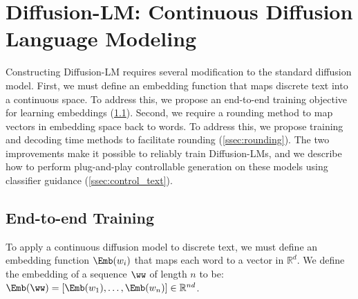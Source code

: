 













\section{Diffusion-LM: Continuous Diffusion Language Modeling}
\label{sec:method}

Constructing Diffusion-LM requires several modification to the standard diffusion model.
First, we must define an embedding function that maps discrete text into a continuous space. To address this, we propose an end-to-end training objective for learning embeddings (\cref{ssec:embeddings}). 
Second, we require a rounding method to map vectors in embedding space back to words. To address this, we propose training and decoding time methods to facilitate rounding (\cref{ssec:rounding}). 
The two improvements make it possible to reliably train Diffusion-LMs, and we describe how to perform plug-and-play controllable generation on these models using classifier guidance (\cref{ssec:control_text}). 







\subsection{End-to-end Training} 
\label{ssec:embeddings}



To apply a continuous diffusion model to discrete text, we must  define an embedding function $\Emb(w_i)$ that maps each word to a vector in $\mathbb{R}^{d}$. We define the embedding of a sequence $\ww$ of length $n$ to be: $\Emb(\ww) = [\Emb(w_1), \dots, \Emb(w_n)] \in \mathbb{R}^{nd}$. 

